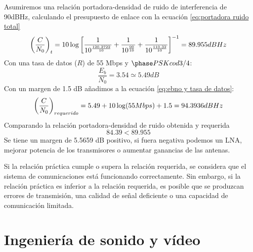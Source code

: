 \documentclass[
	12pt, %
	fleqn, %
	a4paper, %
	oneside, %
]{LegrandOrangeBook}
\begin{document}
\begin{example}
Asumiremos una relación portadora-densidad de ruido de interferencia de 90dBHz, calculando el presupuesto de enlace con la ecuación \ref{eq:portadora ruido total}
\begin{displaymath}
\left(\frac{C}{N_0}\right)_t=10\log\left[\frac{1}{10^{\frac{120.2722}{10}}}+\frac{1}{10^{\frac{90}{10}}}+\frac{1}{10^{\frac{110.32}{10}}}
\right]^{-1}=89.955 dBHz
\end{displaymath}
Con una tasa de datos ($R$) de 55 Mbps y $\phase PSK cod 3/4$:
\begin{displaymath}
\frac{E_b}{N_0}=3.54\simeq 5.49 dB
\end{displaymath}
Con un margen de 1.5 dB añadimos a la ecuación \ref{eq:ebno y tasa de datos}:
\begin{displaymath}
\left(\frac{C}{N_0}\right)_{requerido}=5.49+10\log(55 Mbps)+1.5=94.3936 dBHz
\end{displaymath}
Comparando la relación portadora-densidad de ruido obtenida y requerida
\begin{displaymath}
84.39<89.955
\end{displaymath}
Se tiene un margen de 5.5659 dB positivo, si fuera negativa podemos un LNA, mejorar potencia de los transmisores o aumentar ganancias de las antenas.
\end{example}
\begin{remark}
Si la relación práctica cumple o supera la relación requerida, se considera que el sistema de comunicaciones está funcionando correctamente. Sin embargo, si la relación práctica es inferior a la relación requerida, es posible que se produzcan errores de transmisión, una calidad de señal deficiente o una capacidad de comunicación limitada.
\end{remark}
\part{Ingeniería de sonido y vídeo}
\end{document}
